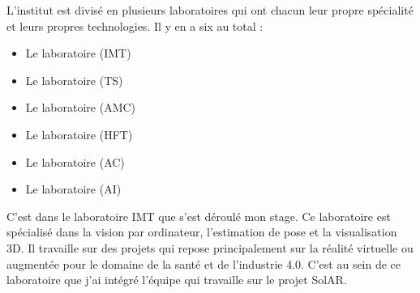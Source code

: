 \par
L'institut est divisé en plusieurs laboratoires qui ont chacun leur propre spécialité et leurs propres technologies. Il y en a six au total :
\begin{itemize}
    \item Le laboratoire \textbf{} (IMT)
    \item Le laboratoire  (TS)
    \item Le laboratoire  (AMC)
    \item Le laboratoire  (HFT)
    \item Le laboratoire  (AC)
    \item Le laboratoire  (AI)
\end{itemize}

\par
C'est dans le laboratoire IMT que s'est déroulé mon stage. Ce laboratoire est spécialisé dans la vision par ordinateur, l'estimation de pose et la visualisation 3D. Il travaille sur des projets qui repose principalement sur la réalité virtuelle ou augmentée pour le domaine de la santé et de l'industrie 4.0. C'est au sein de ce laboratoire que j'ai intégré l'équipe qui travaille sur le projet SolAR.
